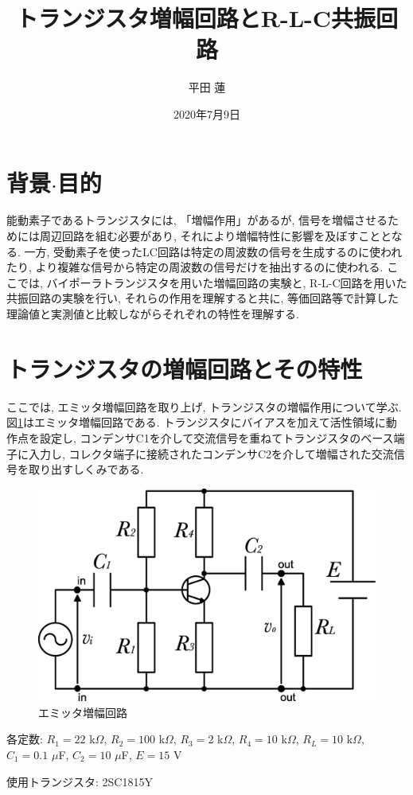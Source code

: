 \documentclass[titlepage]{jsarticle}
\title{トランジスタ増幅回路とR-L-C共振回路}
\author{平田 蓮}
\date{2020年7月9日}
\begin{document}
\maketitle
\section{背景$\cdot$目的}
    能動素子であるトランジスタには, 「増幅作用」があるが, 信号を増幅させるためには周辺回路を組む必要があり,
    それにより増幅特性に影響を及ぼすこととなる. 一方, 受動素子を使ったLC回路は特定の周波数の信号を生成するのに使われたり,
    より複雑な信号から特定の周波数の信号だけを抽出するのに使われる. ここでは, バイポーラトランジスタを用いた増幅回路の実験と, 
    R-L-C回路を用いた共振回路の実験を行い, それらの作用を理解すると共に, 等価回路等で計算した理論値と実測値と比較しながらそれぞれの特性を理解する.

\section{トランジスタの増幅回路とその特性}
    ここでは, エミッタ増幅回路を取り上げ, トランジスタの増幅作用について学ぶ.
    図\ref{fig:tr}はエミッタ増幅回路である. トランジスタにバイアスを加えて活性領域に動作点を設定し,
    コンデンサC1を介して交流信号を重ねてトランジスタのベース端子に入力し,
    コレクタ端子に接続されたコンデンサC2を介して増幅された交流信号を取り出すしくみである.

    \begin{figure}[h]
        \centering
        \includegraphics[width=0.7\hsize]{images/tr.eps}
        \caption{エミッタ増幅回路}
        \label{fig:tr}
    \end{figure}

    各定数: $R_1 = 22$ k$\Omega$, $R_2 = 100$ k$\Omega$, $R_3 = 2$ k$\Omega$, $R_4 = 10$ k$\Omega$,
    $R_L = 10$ k$\Omega$, $C_1 = 0.1$ $\mu$F, $C_2 = 10$ $\mu$F, $E = 15$ V

    使用トランジスタ: 2SC1815Y
\end{document}
